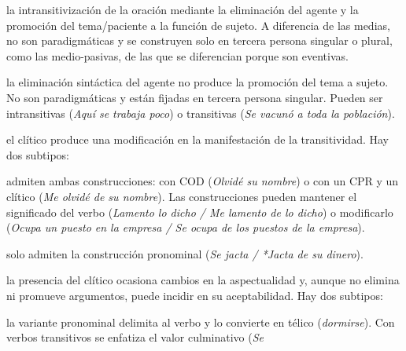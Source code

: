 \begin{glosariogeneral}
\begin{glosario}
\begin{glosario}
\begin{glosario}
                    la intransitivización de la oración mediante la eliminación
                    del agente y la promoción del tema/paciente a la función de
                    sujeto. A diferencia de las medias, no son paradigmáticas y
                    se construyen solo en tercera persona singular o plural,
                    como las medio-pasivas, de las que se diferencian porque son
                    eventivas.
              \item[impersonales:] la eliminación sintáctica del agente no
                    produce la promoción del tema a sujeto. No son
                    paradigmáticas y están fijadas en tercera persona singular.
                    Pueden ser intransitivas (\textit{Aquí se trabaja poco}) o
                    transitivas (\textit{Se vacunó a toda la población}).
            \end{glosario}
          \item[de cambio en la estructura sintáctica:] el clítico produce una
                modificación en la manifestación de la transitividad. Hay dos
                subtipos:
            \begin{glosario}
              \item[alternantes:] admiten ambas construcciones: con COD
                    (\textit{Olvidé su nombre}) o con un CPR y un clítico
                    (\textit{Me olvidé de su nombre}). Las construcciones pueden
                    mantener el significado del verbo (\textit{Lamento lo dicho
                    / Me lamento de lo dicho}) o modificarlo (\textit{Ocupa un
                    puesto en la empresa / Se ocupa de los puestos de la
                    empresa}).
              \item[inherentes:] solo admiten la construcción pronominal
                    (\textit{Se jacta / *Jacta de su dinero}).
            \end{glosario}
          \item[de cambio en la estructura eventiva:] la presencia del clítico
                ocasiona cambios en la aspectualidad y, aunque no elimina ni
                promueve argumentos, puede incidir en su aceptabilidad. Hay dos
                subtipos:
            \begin{glosario}
              \item[de delimitación:] la variante pronominal delimita al verbo y
                    lo convierte en télico (\textit{dormirse}). Con verbos
                    transitivos se enfatiza el valor culminativo (\textit{Se
}
\end{glosario}
\end{glosario}
\end{glosario}
\end{glosariogeneral}

